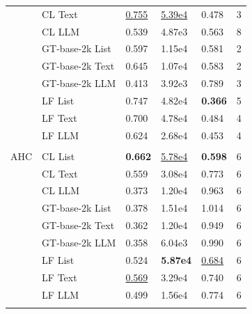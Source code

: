 \begin{table}[!h]
\begin{tabular}[t]{lllllr}
 & CL Text & \underline{0.755} & \underline{5.39e4} & 0.478 & 3\\
\addlinespace
 & CL LLM & 0.539 & 4.87e3 & 0.563 & 8\\
 & GT-base-2k List & 0.597 & 1.15e4 & 0.581 & 2\\
 & GT-base-2k Text & 0.645 & 1.07e4 & 0.583 & 2\\
 & GT-base-2k LLM & 0.413 & 3.92e3 & 0.789 & 3\\
 & LF List & 0.747 & 4.82e4 & \textbf{0.366} & 5\\
\addlinespace
 & LF Text & 0.700 & 4.78e4 & 0.484 & 4\\
 & LF LLM & 0.624 & 2.68e4 & 0.453 & 4\\
\midrule\\
AHC & CL List & \textbf{0.662} & \underline{5.78e4} & \textbf{0.598} & 6\\
 & CL Text & 0.559 & 3.08e4 & 0.773 & 6\\
 & CL LLM & 0.373 & 1.20e4 & 0.963 & 6\\
\addlinespace
 & GT-base-2k List & 0.378 & 1.51e4 & 1.014 & 6\\
 & GT-base-2k Text & 0.362 & 1.20e4 & 0.949 & 6\\
 & GT-base-2k LLM & 0.358 & 6.04e3 & 0.990 & 6\\
 & LF List & 0.524 & \textbf{5.87e4} & \underline{0.684} & 6\\
 & LF Text & \underline{0.569} & 3.29e4 & 0.740 & 6\\
\addlinespace
 & LF LLM & 0.499 & 1.56e4 & 0.774 & 6\\
\midrule\\
\bottomrule
\end{tabular}
\end{table}
